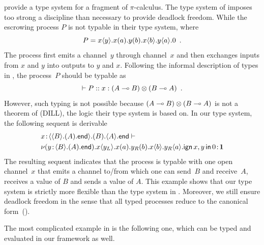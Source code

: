 \citet{pfenning2010} provide a type system for a fragment of $\pi$-calculus.
The type system of \citet{pfenning2010} imposes too strong a discipline
than necessary to provide deadlock freedom.
While the escrowing process $P$ is not typable in their type
system, where
\[
 P = {x}\langle{y}\rangle.{{{x}({a}).{{{y}({b}).{{x}\langle{b}\rangle.{{y}\langle{a}\rangle.{0}}}}}}}\enspace.
\]
The process first emits a channel~$y$ through channel~$x$ and then
exchanges inputs from $x$ and $y$ into outputs to $y$ and $x$.
Following the informal description of types in \citep{pfenning2010},
the process~$P$ should be typable as
\[
 \vdash P::x:(A\multimap B)\otimes(B\multimap A)\enspace.
\]
However, such typing is not possible because $(A\multimap B)\otimes (B\multimap
A)$ is not a theorem of  (DILL), the logic their type system
is based on.
In our type system, the following sequent is derivable
\begin{align*}
&
{x} \mathord{\colon\kern -2pt}{\langle{\langle{B}\rangle.{(A).{\mathsf{end}}}}\rangle.{(B).{\langle{A}\rangle.{\mathsf{end}}}}}
\vdash\\
&{
\nu({y} \mathord{\colon\kern -2pt}{\langle{B}\rangle.{(A).{\mathsf{end}}}}).
{{x}\langle{y_L}\rangle.{{{x}({a}).{{{y_R}({b}).{{x}\langle{b}\rangle.{{y_R}\langle{a}\rangle.{\mathsf{ign }\,{x,y}\,\mathsf{ in }\,{0}}}}}}}}}
} \mathord{\colon\kern -2pt}{\mathbf{1}}
\end{align*}
The resulting sequent indicates that the process is typable with one
open channel~$x$ that emits
a channel to/from which one can send~$B$ and receive~$A$, receives a
value of $B$ and
sends a value of $A$.
This example shows that our type system is strictly more flexible than
the type system in \citet{pfenning2010}.
Moreover, we still ensure deadlock freedom in the sense that all typed
processes reduce to the canonical form~().

The most complicated example in \citet{pfenning2010} is the following
one, which can be typed and evaluated in our framework as well.

